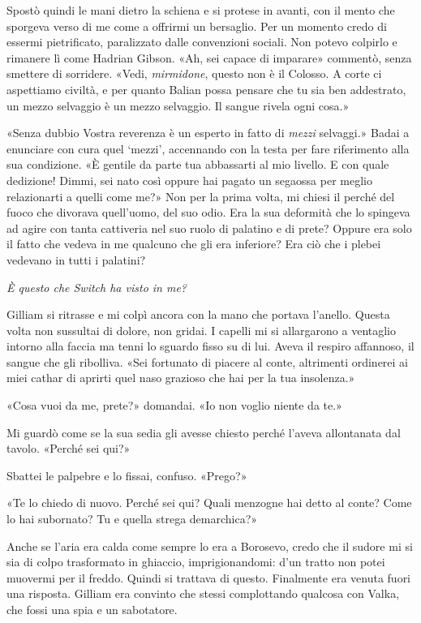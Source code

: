 Spostò quindi le mani dietro la schiena e si protese in avanti, con il
mento che sporgeva verso di me come a offrirmi un bersaglio. Per un
momento credo di essermi pietrificato, paralizzato dalle convenzioni
sociali. Non potevo colpirlo e rimanere lì come Hadrian Gibson. «Ah, sei
capace di imparare» commentò, senza smettere di sorridere. «Vedi,
\emph{mirmidone}, questo non è il Colosso. A corte ci aspettiamo
civiltà, e per quanto Balian possa pensare che tu sia ben addestrato, un
mezzo selvaggio è un mezzo selvaggio. Il sangue rivela ogni cosa.»

«Senza dubbio Vostra reverenza è un esperto in fatto di \emph{mezzi}
selvaggi.» Badai a enunciare con cura quel `mezzi', accennando con la
testa per fare riferimento alla sua condizione. «È gentile da parte tua
abbassarti al mio livello. E con quale dedizione! Dimmi, sei nato così
oppure hai pagato un segaossa per meglio relazionarti a quelli come me?»
Non per la prima volta, mi chiesi il perché del fuoco che divorava
quell'uomo, del suo odio. Era la sua deformità che lo spingeva ad agire
con tanta cattiveria nel suo ruolo di palatino e di prete? Oppure era
solo il fatto che vedeva in me qualcuno che gli era inferiore? Era ciò
che i plebei vedevano in tutti i palatini?

\emph{È questo che Switch ha visto in me?}

Gilliam si ritrasse e mi colpì ancora con la mano che portava l'anello.
Questa volta non sussultai di dolore, non gridai. I capelli mi si
allargarono a ventaglio intorno alla faccia ma tenni lo sguardo fisso su
di lui. Aveva il respiro affannoso, il sangue che gli ribolliva. «Sei
fortunato di piacere al conte, altrimenti ordinerei ai miei cathar di
aprirti quel naso grazioso che hai per la tua insolenza.»

«Cosa vuoi da me, prete?» domandai. «Io non voglio niente da te.»

Mi guardò come se la sua sedia gli avesse chiesto perché l'aveva
allontanata dal tavolo. «Perché sei qui?»

Sbattei le palpebre e lo fissai, confuso. «Prego?»

«Te lo chiedo di nuovo. Perché sei qui? Quali menzogne hai detto al
conte? Come lo hai subornato? Tu e quella strega demarchica?»

Anche se l'aria era calda come sempre lo era a Borosevo, credo che il
sudore mi si sia di colpo trasformato in ghiaccio, imprigionandomi: d'un
tratto non potei muovermi per il freddo. Quindi si trattava di questo.
Finalmente era venuta fuori una risposta. Gilliam era convinto che
stessi complottando qualcosa con Valka, che fossi una spia e un
sabotatore.

